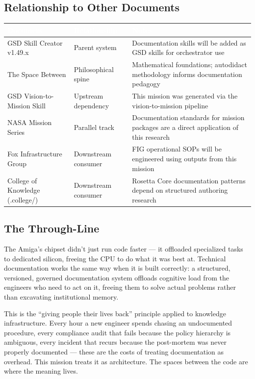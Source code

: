 \documentclass[11pt,letterpaper]{article}
\newcommand{\tableheader}[1]{\textbf{\sffamily\textcolor{white}{#1}}}
\begin{document}
\subsection{Relationship to Other Documents}

\begin{center}
\begin{tabularx}{\textwidth}{L{4cm}L{4cm}X}
\toprule
{}
\tableheader{Document} & \tableheader{Relationship} & \tableheader{Notes} \\
\midrule
GSD Skill Creator v1.49.x & Parent system & Documentation skills will be added as GSD skills for orchestrator use \\
The Space Between & Philosophical spine & Mathematical foundations; autodidact methodology informs documentation pedagogy \\
GSD Vision-to-Mission Skill & Upstream dependency & This mission was generated via the vision-to-mission pipeline \\
NASA Mission Series & Parallel track & Documentation standards for mission packages are a direct application of this research \\
Fox Infrastructure Group & Downstream consumer & FIG operational SOPs will be engineered using outputs from this mission \\
College of Knowledge (.college/) & Downstream consumer & Rosetta Core documentation patterns depend on structured authoring research \\
\bottomrule
\end{tabularx}
\end{center}

\subsection{The Through-Line}

The Amiga's chipset didn't just run code faster --- it offloaded specialized tasks to dedicated silicon, freeing the CPU to do what it was best at. Technical documentation works the same way when it is built correctly: a structured, versioned, governed documentation system offloads cognitive load from the engineers who need to act on it, freeing them to solve actual problems rather than excavating institutional memory.

This is the ``giving people their lives back'' principle applied to knowledge infrastructure. Every hour a new engineer spends chasing an undocumented procedure, every compliance audit that fails because the policy hierarchy is ambiguous, every incident that recurs because the post-mortem was never properly documented --- these are the costs of treating documentation as overhead. This mission treats it as architecture. The spaces between the code are where the meaning lives.
\end{document}
